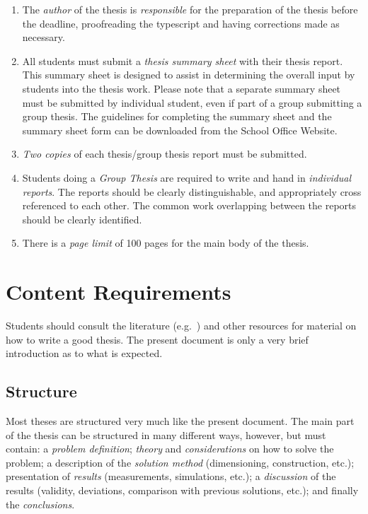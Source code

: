 \begin{enumerate}
\item The \emph{author} of the thesis is \emph{responsible} for the preparation of the
thesis before the deadline, proofreading the
typescript and having corrections made as necessary.
\item All students must submit a \emph{thesis summary sheet} with their thesis
report. This summary sheet is designed to assist
in determining the overall input by students into the thesis work. Please
note that a separate summary sheet must
be submitted by individual student, even if part of a group submitting a
group thesis.
The guidelines for completing
the summary sheet and the summary sheet form can be downloaded from the
School Office Website.
\item \emph{Two copies} of each thesis/group thesis report must be submitted.
\item Students doing a \emph{Group Thesis} are required to write and hand in
\emph{individual reports}.  The reports should be
clearly distinguishable, and appropriately cross referenced to each other.
The common work overlapping between the reports should be clearly
identified.
\item There is a \emph{page limit} of 100 pages for the main body of the thesis.
\end{enumerate}



\chapter{Content Requirements}\label{ch:content}

Students should consult the literature (e.g.~\cite{Sid99,StrWhi79,Coo64})
and other resources for material on how to write a good
thesis.  The present document is only a very brief introduction as to what
is expected.

\nocite{NieLeh03,HasLehKwo05}

\section{Structure}
Most theses are structured very much like the present document.
The main part of the thesis can be structured in many different ways,
however, but must contain: a \emph{problem definition};
\emph{theory} and \emph{considerations} on how to solve the problem;
a description of the \emph{solution method} (dimensioning, construction,
etc.);
presentation of \emph{results} (measurements, simulations, etc.);
a \emph{discussion} of the results (validity, deviations, comparison
with previous solutions, etc.); and finally the \emph{conclusions}.

